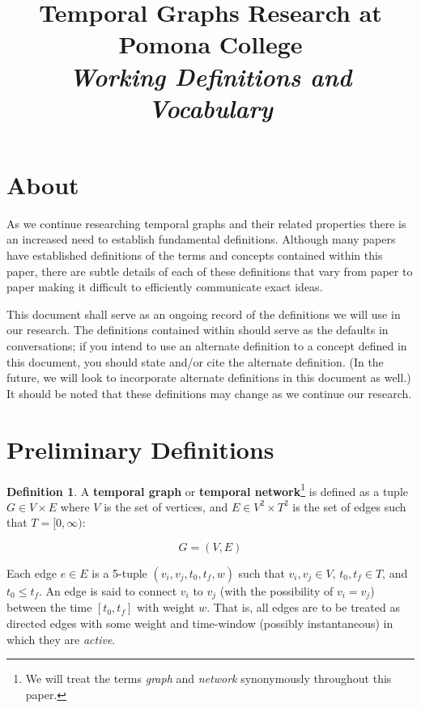 \documentclass{article}
\theoremstyle{definition}
\newtheorem{defn}[thm]{Definition}
\numberwithin{thm}{subsection}
\begin{document}
\title{Temporal Graphs Research at Pomona College\\
  \textit{Working Definitions and Vocabulary}
}
\maketitle

\section{About}

As we continue researching temporal graphs and their related properties there is
an increased need to establish fundamental definitions. Although many papers
have established definitions of the terms and concepts contained within this
paper, there are subtle details of each of these definitions that vary from
paper to paper making it difficult to efficiently communicate exact ideas.

This document shall serve as an ongoing record of the definitions we will use
in our research. The definitions contained within should serve as the defaults
in conversations; if you intend to use an alternate definition to a concept
defined in this document, you should state and/or cite the alternate definition.
(In the future, we will look to incorporate alternate definitions in this
document as well.) It should be noted that these definitions may change as we
continue our research.

\section{Preliminary Definitions}

\begin{defn}
  A \textbf{temporal graph} or \textbf{temporal network}\footnote{We will treat
  the terms \textit{graph} and \textit{network} synonymously throughout this
  paper.} is defined as a tuple $G \in V \times E$ where $V$ is the set of
  vertices, and $E \in V^2 \times T^2$ is the set of edges such that
  $T = [0, \infty)$:

  $$G = (V, E)$$

  Each edge $e \in E$ is a 5-tuple $(v_i, v_j, t_0, t_f, w)$ such that
  $v_i, v_j \in V$, $t_0, t_f \in T$, and $t_0 \leq t_f$. An edge is said to
  connect $v_i$ to $v_j$ (with the possibility of $v_i = v_j$) between the time
  $[t_0, t_f]$ with weight $w$. That is, all edges are to be treated as directed
  edges with some weight and time-window (possibly instantaneous) in which they
  are \textit{active}.
\end{defn}
\end{document}
